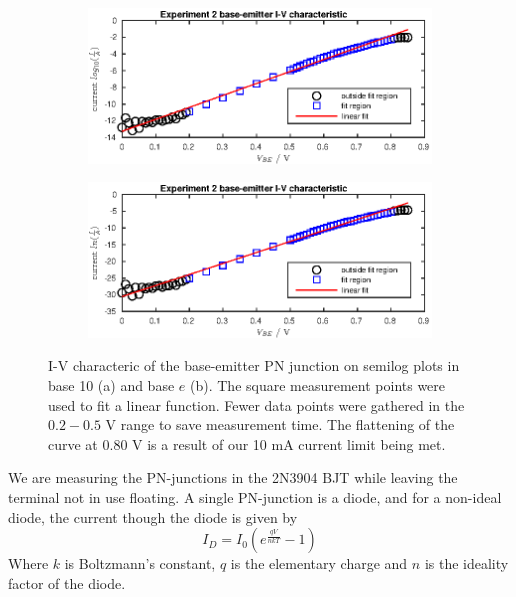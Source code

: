 \begin{figure}
    \center
    \begin{subfigure}{.8\textwidth}
    \center
        \includegraphics[width=\textwidth]{log10ive.eps}
    \caption{}
    \end{subfigure}
    
    \begin{subfigure}{.8\textwidth}
    \center
        \includegraphics[width=\textwidth]{lnive.eps}
    \caption{}
    \end{subfigure}
    \caption{I-V characteric of the base-emitter PN junction on semilog plots in base 10 (a) and base \(e\) (b). 
    The square measurement points were used to fit a linear function. Fewer data points were gathered in the \(0.2-0.5\) V
range to save measurement time. The flattening of the curve at \(0.80\) V is a result of our 10 mA current limit being met.}
\label{fig:ivelog}
\end{figure}

We are measuring the PN-junctions in the 2N3904 BJT while leaving the terminal not in use floating. A single PN-junction is a
diode, and for a non-ideal diode, the current though the diode is given by 
\begin{equation*}
    I_D = I_0\left(e^{\frac{qV}{nkT}}-1\right)
\end{equation*}
Where \(k\) is Boltzmann's constant, \(q\) is the elementary charge and \(n\) is the ideality factor of the diode.

